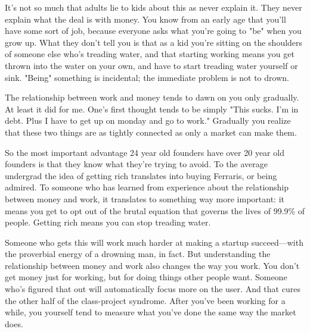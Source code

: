It's not so
                  much that adults lie to kids about this as never explain it.
                  They never explain what the deal is with money. You know from
                  an early age that you'll have some sort of job, because
                  everyone asks what you're going to "be" when you grow up. What
                  they don't tell you is that as a kid you're sitting on the
                  shoulders of someone else who's treading water, and that
                  starting working means you get thrown into the water on your
                  own, and have to start treading water yourself or sink.
                  "Being" something is incidental; the immediate problem is not
                  to drown.

The relationship between work and money
                  tends to dawn on you only gradually. At least it did for me.
                  One's first thought tends to be simply "This sucks. I'm in
                  debt. Plus I have to get up on monday and go to work."
                  Gradually you realize that these two things are as tightly
                  connected as only a market can make them.

So the
                  most important advantage 24 year old founders have over 20
                  year old founders is that they know what they're trying to
                  avoid. To the average undergrad the idea of getting rich
                  translates into buying Ferraris, or being admired. To someone
                  who has learned from experience about the relationship between
                  money and work, it translates to something way more important:
                  it means you get to opt out of the brutal equation that
                  governs the lives of 99.9\% of people. Getting rich means you
                  can stop treading water.

Someone who gets this will
                  work much harder at making a startup succeed---with the
                  proverbial energy of a drowning man, in fact. But
                  understanding the relationship between money and work also
                  changes the way you work. You don't get money just for
                  working, but for doing things other people want. Someone who's
                  figured that out will automatically focus more on the user.
                  And that cures the other half of the class-project syndrome.
                  After you've been working for a while, you yourself tend to
                  measure what you've done the same way the market does.

